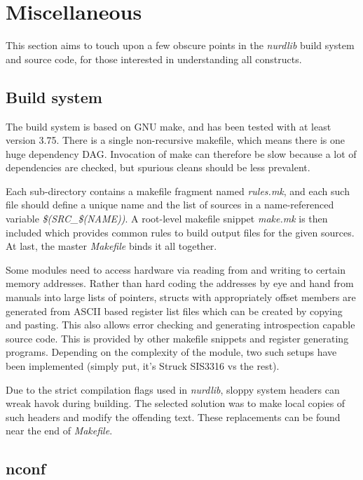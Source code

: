 \documentclass{article}
\begin{document}
\section{Miscellaneous}

This section aims to touch upon a few obscure points in the \emph{nurdlib}
build system and source code, for those interested in understanding all
constructs.



\subsection{Build system}

The build system is based on GNU make, and has been tested with at least
version 3.75. There is a single non-recursive makefile, which means there is
one huge dependency DAG. Invocation of make can therefore be slow because a
lot of dependencies are checked, but spurious cleans should be less prevalent.

Each sub-directory contains a makefile fragment named \emph{rules.mk}, and
each such file should define a unique name and the list of sources in a
name-referenced variable \emph{\$(SRC\_\$(NAME))}. A root-level makefile
snippet \emph{make.mk} is then included which provides common rules to build
output files for the given sources. At last, the master \emph{Makefile} binds
it all together.

Some modules need to access hardware via reading from and writing to certain
memory addresses. Rather than hard coding the addresses by eye and hand from
manuals into large lists of pointers, structs with appropriately offset
members are generated from ASCII based register list files which can be
created by copying and pasting. This also allows error checking and generating
introspection capable source code. This is provided by other makefile snippets
and register generating programs. Depending on the complexity of the module,
two such setups have been implemented (simply put, it's Struck SIS3316 vs the
rest).

Due to the strict compilation flags used in \emph{nurdlib}, sloppy system
headers can wreak havok during building. The selected solution was to make
local copies of such headers and modify the offending text. These replacements
can be found near the end of \emph{Makefile}.



\subsection{nconf}
\end{document}
